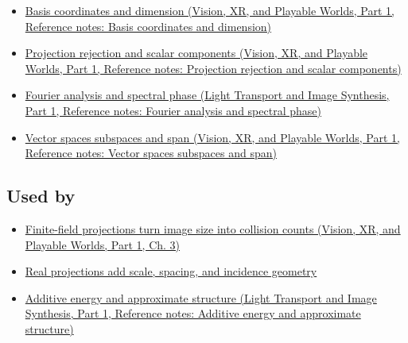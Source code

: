 \hypertarget{appendix-3c73f7862157-prerequisites}{}

\begin{itemize}
\tightlist
\item
  \href{../07-Vision-XR-and-Playable-Worlds-P01/main.pdf\#appendix-ce0341f7ea0d}{Basis coordinates and dimension (Vision, XR, and Playable Worlds, Part 1, Reference notes: Basis coordinates and dimension)}
\item
  \href{../07-Vision-XR-and-Playable-Worlds-P01/main.pdf\#appendix-505a502c372a}{Projection rejection and scalar components (Vision, XR, and Playable Worlds, Part 1, Reference notes: Projection rejection and scalar components)}
\item
  \href{../04-Light-Transport-and-Image-Synthesis-P01/main.pdf\#appendix-b60686ba06a1}{Fourier analysis and spectral phase (Light Transport and Image Synthesis, Part 1, Reference notes: Fourier analysis and spectral phase)}
\item
  \href{../07-Vision-XR-and-Playable-Worlds-P01/main.pdf\#appendix-173b52c063ae}{Vector spaces subspaces and span (Vision, XR, and Playable Worlds, Part 1, Reference notes: Vector spaces subspaces and span)}
\end{itemize}

\subsection{Used by}\label{appendix-3c73f7862157-used-by}

\hypertarget{appendix-3c73f7862157-used-by}{}

\begin{itemize}
\tightlist
\item
  \href{../07-Vision-XR-and-Playable-Worlds-P01/main.pdf\#04-visual-computing-ii-ch032-finite-field-projections-turn-image-size-into-collision-counts}{Finite-field projections turn image size into collision counts (Vision, XR, and Playable Worlds, Part 1, Ch. 3)}
\item
  \hyperref[04-visual-computing-ii-ch033-real-projections-add-scale-spacing-and-incidence-geometry]{Real projections add scale, spacing, and incidence geometry}
\item
  \href{../04-Light-Transport-and-Image-Synthesis-P01/main.pdf\#appendix-b0732b22e7d6}{Additive energy and approximate structure (Light Transport and Image Synthesis, Part 1, Reference notes: Additive energy and approximate structure)}
\end{itemize}

